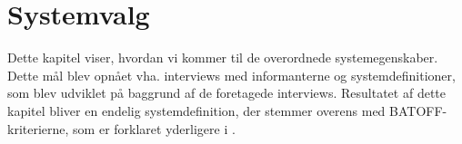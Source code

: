 \chapter{Systemvalg}
\label{chap:systemvalg}
Dette kapitel viser, hvordan vi kommer til de overordnede systemegenskaber. Dette mål blev opnået vha. interviews med informanterne og systemdefinitioner, som blev udviklet på baggrund af de foretagede interviews. Resultatet af dette kapitel bliver en endelig systemdefinition, der stemmer overens med BATOFF-kriterierne, som er forklaret yderligere i .





